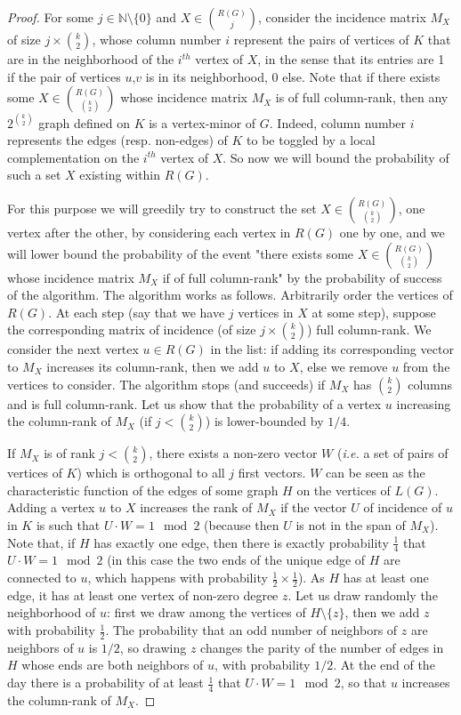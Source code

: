 \documentclass[10pt,a4paper]{article}
\newcommand{\sm}{\setminus}
\begin{document}
\begin{proof}
    For some $j \in \mathbb N\setminus\{0\}$ and $X \in {R(G) \choose j}$, consider the incidence matrix $M_X$ of size $j \times {k \choose 2}$, whose column number $i$ represent the pairs of vertices of $K$ that are in the neighborhood of the $i^{th}$ vertex of $X$, in the sense that its entries are 1 if the pair of vertices $u$,$v$ is in its neighborhood, 0 else. Note that if there exists some $X \in {R(G) \choose {k \choose 2}}$ whose incidence matrix $M_X$ is of full column-rank, then any $2^{{k \choose 2}}$ graph defined on $K$ is a vertex-minor of $G$. Indeed, column number $i$ represents the edges (resp. non-edges) of $K$ to be toggled by a local complementation on the $i^{th}$ vertex of $X$. So now we will bound the probability of such a set $X$ existing within $R(G)$.

    For this purpose we will greedily try to construct the set $X \in {R(G) \choose {k \choose 2}}$, one vertex after the other, by considering each vertex in $R(G)$ one by one, and we will lower bound the probability of the event "there exists some $X \in {R(G) \choose {k \choose 2}}$ whose incidence matrix $M_X$ if of full column-rank" by the probability of success of the algorithm. The algorithm works as follows. Arbitrarily order the vertices of $R(G)$. At each step (say that we have $j$ vertices in $X$ at some step), suppose the corresponding matrix of incidence (of size $j \times {k \choose 2}$) full column-rank. We consider the next vertex $u \in R(G)$ in the list: if adding its corresponding vector to $M_X$ increases its column-rank, then we add $u$ to $X$, else we remove $u$ from the vertices to consider. The algorithm stops (and succeeds) if $M_X$ has ${k \choose 2}$ columns and is full column-rank. Let us show that the probability of a vertex $u$ increasing the column-rank of $M_X$ (if $j < {k \choose 2}$) is lower-bounded by $1/4$. 

    If $M_X$ is of rank $j < {k \choose 2}$, there exists a non-zero vector $W$ (\emph{i.e.} a set of pairs of vertices of $K$) which is orthogonal to all $j$ first vectors. $W$ can be seen as the characteristic function of the edges of some graph $H$ on the vertices of $L(G)$. Adding a vertex $u$ to $X$ increases the rank of $M_X$ if the vector $U$ of incidence of $u$ in $K$ is such that $U \cdot W = 1 \mod 2$ (because then $U$ is not in the span of $M_X$). Note that, if $H$ has exactly one edge, then there is exactly probability $\frac{1}{4}$ that $U \cdot W = 1 \mod 2$ (in this case the two ends of the unique edge of $H$ are connected to $u$, which happens with probability $\frac{1}{2} \times \frac{1}{2}$). As $H$ has at least one edge, it has at least one vertex of non-zero degree $z$. Let us draw randomly the neighborhood of $u$: first we draw among the vertices of $H\sm\{z\}$, then we add $z$ with probability $\frac{1}{2}$. The probability that an odd number of neighbors of $z$ are neighbors of $u$ is $1/2$, so drawing $z$ changes the parity of the number of edges in $H$ whose ends are both neighbors of $u$, with probability $1/2$. At the end of the day there is a probability of at least $\frac{1}{4}$ that $U \cdot W = 1 \mod 2$, so that $u$ increases the column-rank of $M_X$.
    

\end{proof}
\end{document}
